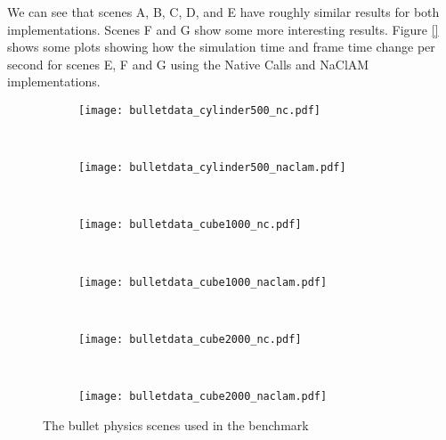 We can see that scenes A, B, C, D, and E have roughly similar results for both implementations. Scenes F and G show some more interesting results. Figure \ref{} shows some plots showing how the simulation time and frame time change per second for scenes E, F and G using the Native Calls and NaClAM implementations.

\begin{figure}
        \centering
        \begin{subfigure}[b]{\textwidth}
                \texttt{[image: bulletdata\_cylinder500\_nc.pdf]}
                \label{fig:screenshot_jenga_10}
        \end{subfigure}%
        ~ 
        \begin{subfigure}[b]{\textwidth}
                \texttt{[image: bulletdata\_cylinder500\_naclam.pdf]}
                \label{fig:screenshot_jenga_20}
        \end{subfigure}
        ~ 
        \begin{subfigure}[b]{\textwidth}
                \texttt{[image: bulletdata\_cube1000\_nc.pdf]}
                \label{fig:random_shapes}
        \end{subfigure}
        ~ 
        \begin{subfigure}[b]{\textwidth}
                \texttt{[image: bulletdata\_cube1000\_naclam.pdf]}
                \label{fig:cubes_250}
        \end{subfigure}
        ~ 
        \begin{subfigure}[b]{\textwidth}
                \texttt{[image: bulletdata\_cube2000\_nc.pdf]}
                \label{fig:cylinders_500}
        \end{subfigure}%
        ~ 
        \begin{subfigure}[b]{\textwidth}
                \texttt{[image: bulletdata\_cube2000\_naclam.pdf]}
                \label{fig:cubes_1000}
        \end{subfigure}
        \caption{The bullet physics scenes used in the benchmark}\label{fig:bullet_screenshots}
\end{figure}



